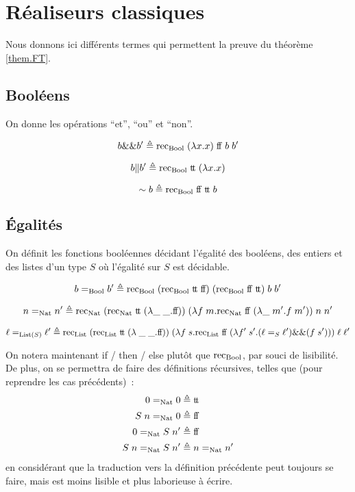 \documentclass{article}
\begin{document}
\appendix

\section{Réaliseurs classiques}\label{app.A}

Nous donnons ici différents termes qui permettent la preuve du théorème \ref{them.FT}.

\subsection{Booléens}

On donne les opérations ``et'', ``ou'' et ``non''.

\[b \&\& b' \triangleq \mathrm{rec}_{\mathrm{Bool}}\;(\lambda x.x)\;\mathrm{f}\!\mathrm{f}\;b\;b'\]

\[b \| b'\triangleq \mathrm{rec}_{\mathrm{Bool}}\;\mathrm{t}\!\mathrm{t}\;(\lambda x.x)\]

\[\sim b \triangleq \mathrm{rec}_{\mathrm{Bool}}\;\mathrm{f}\!\mathrm{f}\;\mathrm{t}\!\mathrm{t}\;b\]

\subsection{\'Egalités}

On définit les fonctions booléennes décidant l'égalité des booléens, des entiers et des listes d'un type $S$ où l'égalité sur $S$ est décidable.

\[b =_{\mathrm{Bool}} b' \triangleq \mathrm{rec}_{\mathrm{Bool}}\;(\mathrm{rec}_{\mathrm{Bool}}\;\mathrm{t}\!\mathrm{t}\;\mathrm{f}\!\mathrm{f})\;(\mathrm{rec}_{\mathrm{Bool}}\;\mathrm{f}\!\mathrm{f}\;\mathrm{t}\!\mathrm{t})\;b\;b'\]

\[n =_{\mathrm{Nat}} n' \triangleq \mathrm{rec}_{\mathrm{Nat}} \;(\mathrm{rec}_{\mathrm{Nat}}\;\mathrm{t}\!\mathrm{t}\;(\lambda \_\;\_.\mathrm{f}\!\mathrm{f}))\;(\lambda f\;m.\mathrm{rec}_{\mathrm{Nat}}\;\mathrm{f}\!\mathrm{f}\;(\lambda\_\;m'.f\;m'))\;n\;n'\]

\[\ell =_{\mathrm{List}(S)} \ell' \triangleq \mathrm{rec}_{\mathrm{List}}\;(\mathrm{rec}_{\mathrm{List}}\;\mathrm{t}\!\mathrm{t}\;(\lambda\;\_\;\_.\mathrm{f}\!\mathrm{f}))\;(\lambda f\;s.\mathrm{rec}_{\mathrm{List}}\;\mathrm{f}\!\mathrm{f}\;(\lambda f'\;s'.(\ell =_S \ell')\&\& (f\;s')))\;\ell\;\ell'\]

On notera maintenant if / then / else plutôt que $\mathrm{rec}_{\mathrm{Bool}}$, par souci de lisibilité. De plus, on se permettra de faire des définitions récursives, telles que (pour reprendre les cas précédents)~:
\begin{align*}
    0 =_{\mathrm{Nat}} 0 &\triangleq \mathrm{t}\!\mathrm{t} \\
    S\;n =_{\mathrm{Nat}} 0 &\triangleq \mathrm{f}\!\mathrm{f} \\
    0 =_{\mathrm{Nat}} S\;n' &\triangleq \mathrm{f}\!\mathrm{f}\\
    S\;n=_{\mathrm{Nat}} S\;n' &\triangleq n =_{\mathrm{Nat}} n'
\end{align*}
en considérant que la traduction vers la définition précédente peut toujours se faire, mais est moins lisible et plus laborieuse à écrire.
\end{document}
